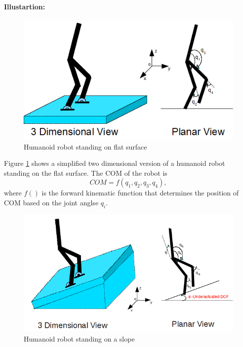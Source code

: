 \paragraph{Illustartion:}    
     \begin{figure}
	    \centering
    	\includegraphics[scale=0.75]{Bilder/robot_flatfloor}
	    \caption{Humanoid robot standing on flat surface}	
	    \label{fig:flat_floor}
    \end{figure}
   Figure \ref{fig:flat_floor} shows a simplified two dimensional version of a humanoid robot standing on the flat surface. The COM of the robot is 
    \begin{equation}
    \label{eq:fwkin_flat}
    COM = f(q_1,q_2,q_3,q_4),
    \end{equation}
    where $f()$ is the forward kinematic function that determines the position of COM based on the joint anglse $q_i$. 
    \begin{figure}
	    \centering
    	\includegraphics[scale=0.65]{Bilder/robot_slope}
	    \caption{Humanoid robot standing on a slope}	
	    \label{fig:slope}
    \end{figure}
